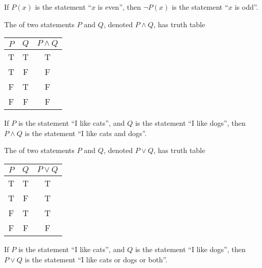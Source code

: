 \begin{example}
    If $P(x)$ is the statement ``$x$ is even'', then $\lnot P(x)$ is the statement ``$x$ is odd''.
\end{example}

\begin{definition}
    The  of two statements $P$ and $Q$, denoted $P \land Q$, has truth table
    \begin{table}[H]
        \centering
        \begin{tabular}{|c|c|c|}
        \hline
        $P$ & $Q$ & $P \land Q$ \\ \hline\hline
        T & T & T \\ \hline
        T & F & F \\ \hline
        F & T & F \\ \hline
        F & F & F \\ \hline
        \end{tabular}
    \end{table}
\end{definition}

\begin{example}
    If $P$ is the statement ``I like cats'', and $Q$ is the statement ``I like dogs'', then $P \land Q$ is the statement ``I like cats and dogs''.
\end{example}

\begin{definition}
    The  of two statements $P$ and $Q$, denoted $P \lor Q$, has truth table
    \begin{table}[H]
        \centering
        \begin{tabular}{|c|c|c|}
        \hline
        $P$ & $Q$ & $P \lor Q$ \\ \hline\hline
        T & T & T \\ \hline
        T & F & T \\ \hline
        F & T & T \\ \hline
        F & F & F \\ \hline
        \end{tabular}
    \end{table}
\end{definition}

\begin{example}
    If $P$ is the statement ``I like cats'', and $Q$ is the statement ``I like dogs'', then $P \lor Q$ is the statement ``I like cats or dogs or both''.
\end{example}


